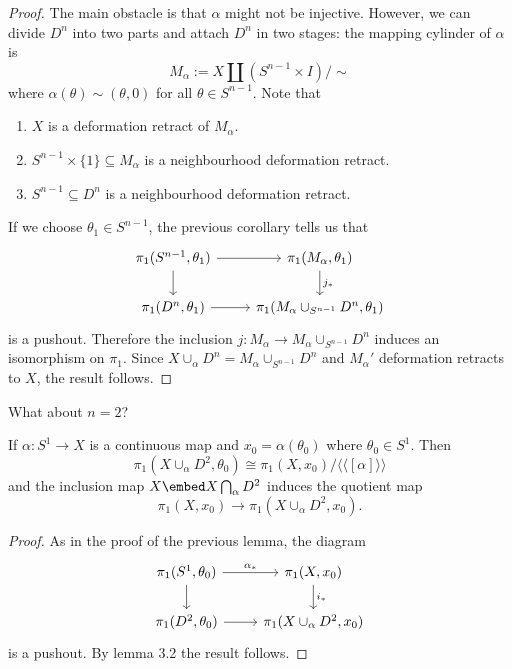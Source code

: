 \documentclass[a4paper]{article}
\begin{document}
\begin{proof}
  The main obstacle is that \(\alpha\) might not be injective. However, we can divide \(D^n\) into two parts and attach \(D^n\) in two stages: the mapping cylinder of \(\alpha\) is
  \[
    M_\alpha := X \amalg (S^{n - 1} \times I) / \sim
  \]
  where \(\alpha(\theta) \sim (\theta, 0)\) for all \(\theta \in S^{n - 1}\). Note that
  \begin{enumerate}
  \item \(X\) is a deformation retract of \(M_\alpha\).
  \item \(S^{n - 1} \times \{1\} \subseteq M_\alpha\) is a neighbourhood deformation retract.
  \item \(S^{n - 1} \subseteq D^n\) is a neighbourhood deformation retract.
  \end{enumerate}
  If we choose \(\theta_1 \in S^{n - 1}\), the previous corollary tells us that
  \[
    \begin{tikzcd}
      \pi_1(S^{n - 1}, \theta_1) \ar[r] \ar[d] & \pi_1(M_\alpha, \theta_1) \ar[d, "j_*"] \\
      \pi_1(D^n, \theta_1) \ar[r] & \pi_1(M_\alpha \cup_{S^{n - 1}} D^n, \theta_1)
    \end{tikzcd}
  \]
  is a pushout. Therefore the inclusion \(j: M_\alpha \to M_\alpha \cup_{S^{n - 1}} D^n\) induces an isomorphism on \(\pi_1\). Since \(X \cup_\alpha D^n = M_\alpha \cup_{S^{n - 1}} D^n\) and \(M_\alpha'\) deformation retracts to \(X\), the result follows.
\end{proof}

What about \(n = 2\)?

\begin{lemma}
  If \(\alpha: S^1 \to X\) is a continuous map and \(x_0 = \alpha(\theta_0)\) where \(\theta_0 \in S^1\). Then
  \[
    \pi_1(X \cup_\alpha D^2, \theta_0) \cong \pi_1(X, x_0) / \langle\langle [\alpha] \rangle\rangle
  \]
  and the inclusion map \(X \embed X \bigcap_\alpha D^2\) induces the quotient map
  \[
    \pi_1(X, x_0) \to \pi_1(X \cup_\alpha D^2, x_0).
  \]
\end{lemma}

\begin{proof}
  As in the proof of the previous lemma, the diagram
  \[
    \begin{tikzcd}
      \pi_1(S^1, \theta_0) \ar[r, "\alpha_*"] \ar[d] & \pi_1(X, x_0) \ar[d, "i_*"] \\
      \pi_1(D^2, \theta_0) \ar[r] & \pi_1(X \cup_\alpha D^2, x_0)
    \end{tikzcd}
  \]
  is a pushout. By lemma 3.2 the result follows.
\end{proof}
\end{document}
